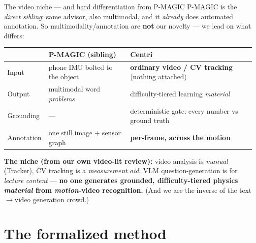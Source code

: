 \documentclass[aspectratio=169,10pt]{beamer}
\newcommand{\hl}[1]{{\bfseries\color{cAccent}#1}}
\begin{document}
\begin{frame}{The video niche --- and hard differentiation from P-MAGIC}
\scriptsize
P-MAGIC is the \emph{direct sibling}: same advisor, also multimodal, and it \emph{already} does
automated annotation. So multimodality/annotation are \textbf{not} our novelty --- we lead on what differs:
\vspace{0.3em}
\begin{center}
\renewcommand{\arraystretch}{1.3}
\begin{tabular}{@{}lll@{}}
\toprule
 & \textbf{\color{cPed}P-MAGIC (sibling)} & \textbf{\color{cApp}Centri} \\
\midrule
Input & phone IMU bolted to the object & \hl{ordinary video / CV tracking} (nothing attached) \\
Output & multimodal word \emph{problems} & difficulty-tiered learning \emph{material} \\
Grounding & --- & deterministic gate: every number vs ground truth \\
Annotation & one still image $+$ sensor graph & \hl{per-frame, across the motion} \\
\bottomrule
\end{tabular}
\end{center}
\vspace{0.4em}
\begin{tcolorbox}[colback=cAccent!6,colframe=cAccent,boxsep=2pt,left=5pt,right=5pt]
\scriptsize \textbf{The niche (from our own video-lit review):} video analysis is \emph{manual}
(Tracker), CV tracking is a \emph{measurement aid}, VLM question-generation is for \emph{lecture
content} --- \textbf{no one generates grounded, difficulty-tiered physics \emph{material} from
\emph{motion}-video recognition.} (And we are the inverse of the text$\to$video generation crowd.)
\end{tcolorbox}
\end{frame}

\section{The formalized method}
\end{document}
